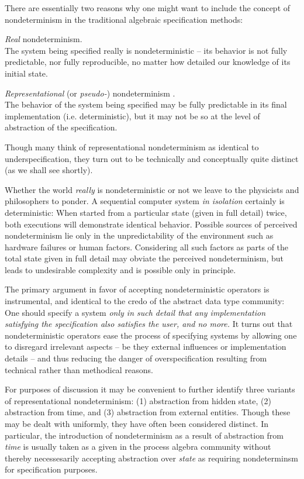 There are essentially two reasons 
why one might want to include the concept of nondeter\-minism in the 
traditional algebraic specification methods:
\begin{enum}
\item {\em Real} nondeterminism.\\
The system being specified 
really is nondeterministic --  its behavior is not fully 
pre\-dict\-able, nor fully reproducible, no matter how detailed our 
knowledge of its initial state.
\item {\em Representational} (or {\em pseudo-}) nondeterminism \cite{c:64, c:121, c:130}.\\
The behavior of the system 
being specified may be fully predictable in its final 
imple\-mentation (i.e. deterministic), but it may not be so at the 
level of abstraction of the specification.
\end{enum}
Though many think of 
representational nondeterminism as identical to 
under\-specifi\-cation, they turn out to be technically and 
conceptually quite distinct (as we shall see shortly). 

Whether the world {\em really} is 
nondeterministic or not we leave to the physicists and 
phi\-lo\-sophers to ponder. A sequential computer system {\em in isolation}
 certainly is deterministic: When started from a particular state 
(given in full detail) twice, both executions will demonstrate 
identical behavior. Possible sources of perceived nondeterminism lie 
only in the unpredictability of the environment such as hardware failures or human 
factors. Considering all such factors as parts of the total state 
given in full detail may obviate the perceived nondeterminism, 
but leads to undesirable complexity and is possible only 
in principle.

The primary argument in favor of accepting nondeterministic operators 
is instrumental, and identical to the credo of the abstract data type 
community: One should specify a system {\em 
only in such detail that any implementation satisfying the 
specification also satisfies the user, and no more.} It turns out 
that nondeterministic operators ease the process of specifying 
systems by allowing one to disregard irrelevant aspects  -- 
be they external influences or implementation details --  
and thus reducing the danger of over\-specification resulting from 
technical rather than methodical reasons. 

For purposes of discussion it may be convenient to further identify 
three variants of representational nondeterminism: 
(1) abstraction from hidden state, (2) 
abstraction from time, and (3) abstraction from external entities. 
Though these may be dealt with uniformly, they have often been 
considered distinct. In particular, the introduction of 
nonde\-terminism as a result of 
abstraction from {\em time} is usually taken as a given in the process 
alge\-bra community without thereby necessesarily accepting 
abstraction over {\em state} as requiring nondeterminsm for specification purposes.

